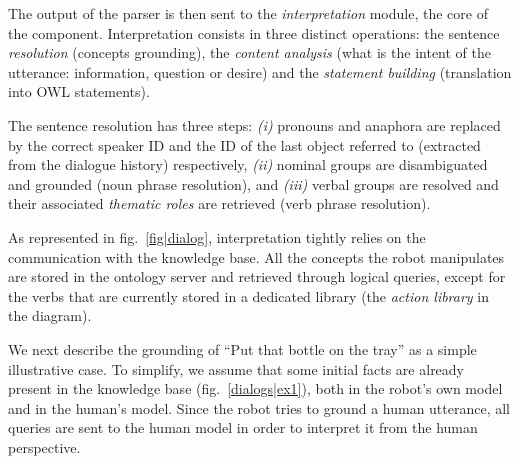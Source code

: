 \documentclass{svmult}
\begin{document}
The output of the parser is then sent to the \emph{interpretation} module, the
core of the component.  Interpretation consists in three distinct operations:
the sentence \emph{resolution} (concepts grounding), the \emph{content
analysis} (what is the intent of the utterance: information, question or
desire) and the \emph{statement building} (translation into OWL statements).

The sentence resolution has three steps: {\it(i)} pronouns and anaphora are
replaced by the correct speaker ID and the ID of the last object referred to
(extracted from the dialogue history) respectively, {\it(ii)} nominal groups are
disambiguated and grounded (noun phrase resolution), and {\it(iii)}
verbal groups are resolved and their associated \emph{thematic roles} are
retrieved (verb phrase resolution).

As represented in fig.~\ref{fig|dialog}, interpretation tightly relies on the
communication with the knowledge base. All the concepts the robot manipulates
are stored in the ontology server and retrieved through logical
queries, except for the verbs that are currently stored in a dedicated library
(the \emph{action library} in the diagram).

We next describe the grounding of ``Put that bottle on the tray'' as a simple
illustrative case. To simplify, we assume that some initial facts are already
present in the knowledge base (fig.~\ref{dialogs|ex1}), both in the robot's own
model and in the human's model.  Since the robot tries to ground a human
utterance, all queries are sent to the human model in order to interpret it
from the human perspective. 
\end{document}
